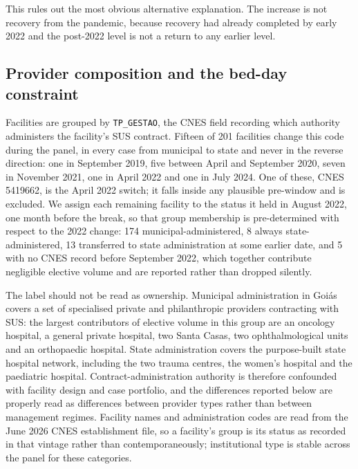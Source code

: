 This rules out the most obvious alternative explanation. The increase is not
recovery from the pandemic, because recovery had already completed by early
2022 and the post-2022 level is not a return to any earlier level.

\subsection{Provider composition and the bed-day constraint}
\label{sec:provider}

Facilities are grouped by \texttt{TP\_GESTAO}, the CNES field recording which
authority administers the facility's SUS contract. Fifteen of 201 facilities
change this code during the panel, in every case from municipal to state and
never in the reverse direction: one in September 2019, five between April and
September 2020, seven in November 2021, one in April 2022 and one in July 2024.
One of these, CNES 5419662, is the April 2022 switch; it falls inside any
plausible pre-window and is excluded. We assign each remaining facility to the
status it held in August 2022, one month before the break, so that group
membership is pre-determined with respect to the 2022 change: 174 municipal-administered,
8 always state-administered, 13 transferred to state administration at some
earlier date, and 5 with no CNES record before September 2022, which together
contribute negligible elective volume and are reported rather than dropped
silently.

The label should not be read as ownership. Municipal administration in Goi\'as
covers a set of specialised private and philanthropic providers contracting with
SUS: the largest contributors of elective volume in this group are an oncology
hospital, a general private hospital, two Santa Casas, two ophthalmological
units and an orthopaedic hospital. State administration covers the purpose-built
state hospital network, including the two trauma centres, the women's hospital
and the paediatric hospital. Contract-administration authority is therefore
confounded with facility design and case portfolio, and the differences reported
below are properly read as differences between provider types rather than
between management regimes. Facility names and administration
codes are read from the June 2026 CNES establishment file, so a facility's group
is its status as recorded in that vintage rather than contemporaneously;
institutional type is stable across the panel for these categories.

